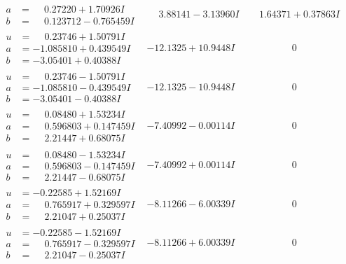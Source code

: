 \documentclass[1p]{elsarticle_modified}
\theoremstyle{definition}
\begin{document}
$$\begin{array}{c|c|c}
\begin{aligned}
a &= \phantom{-}0.27220 + 1.70926 I \\
b &= \phantom{-}0.123712 - 0.765459 I\end{aligned}
 & \phantom{-}3.88141 - 3.13960 I & \phantom{-}1.64371 + 0.37863 I \\ \hline\begin{aligned}
u &= \phantom{-}0.23746 + 1.50791 I \\
a &= -1.085810 + 0.439549 I \\
b &= -3.05401 + 0.40388 I\end{aligned}
 & -12.1325 + 10.9448 I & \phantom{-0.000000 } 0 \\ \hline\begin{aligned}
u &= \phantom{-}0.23746 - 1.50791 I \\
a &= -1.085810 - 0.439549 I \\
b &= -3.05401 - 0.40388 I\end{aligned}
 & -12.1325 - 10.9448 I & \phantom{-0.000000 } 0 \\ \hline\begin{aligned}
u &= \phantom{-}0.08480 + 1.53234 I \\
a &= \phantom{-}0.596803 + 0.147459 I \\
b &= \phantom{-}2.21447 + 0.68075 I\end{aligned}
 & -7.40992 - 0.00114 I & \phantom{-0.000000 } 0 \\ \hline\begin{aligned}
u &= \phantom{-}0.08480 - 1.53234 I \\
a &= \phantom{-}0.596803 - 0.147459 I \\
b &= \phantom{-}2.21447 - 0.68075 I\end{aligned}
 & -7.40992 + 0.00114 I & \phantom{-0.000000 } 0 \\ \hline\begin{aligned}
u &= -0.22585 + 1.52169 I \\
a &= \phantom{-}0.765917 + 0.329597 I \\
b &= \phantom{-}2.21047 + 0.25037 I\end{aligned}
 & -8.11266 - 6.00339 I & \phantom{-0.000000 } 0 \\ \hline\begin{aligned}
u &= -0.22585 - 1.52169 I \\
a &= \phantom{-}0.765917 - 0.329597 I \\
b &= \phantom{-}2.21047 - 0.25037 I\end{aligned}
 & -8.11266 + 6.00339 I & \phantom{-0.000000 } 0 \\ \hline\begin{aligned}

\end{aligned}
\end{array}$$
\end{document}
